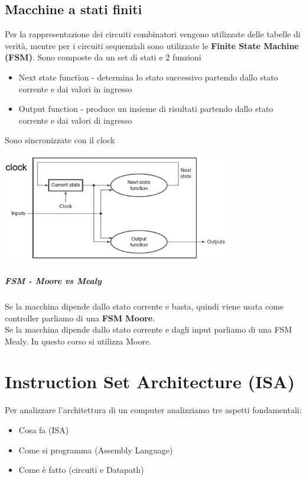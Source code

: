 \documentclass[12pt, a4paper, openany]{book}
\begin{document}
\section{Macchine a stati finiti}
Per la rappresentazione dei circuiti combinatori vengono utilizzate 
delle tabelle di verità, mentre per i circuiti sequenziali sono utilizzate le 
\textbf{Finite State Machine (FSM)}.
Sono composte da un set di stati e 2 funzioni 
\begin{itemize}
    \item Next state function - determina lo stato successivo partendo dallo stato corrente
    e dai valori in ingresso
    \item Output function - produce un insieme di risultati partendo dallo stato corrente
    e dai valori di ingresso
\end{itemize}
Sono sincronizzate con il clock
\begin{center}
    \includegraphics[width=100mm, scale=0.5]{FSM.png}
\end{center}
\paragraph*{FSM - Moore vs Mealy}
Se la macchina dipende dallo stato corrente e basta, quindi viene usata come controller
parliamo di una \textbf{FSM Moore}.
\\ Se la macchina dipende dallo stato corrente e dagli input parliamo di una FSM Mealy.
In questo corso si utilizza Moore.

\chapter{Instruction Set Architecture (ISA)}
Per analizzare l'architettura di un computer analizziamo tre aspetti
fondamentali:
\begin{itemize}
    \item Cosa fa (ISA)
    \item Come si programma (Assembly Language)
    \item Come è fatto (circuiti e Datapath)
\end{itemize}
\end{document}
